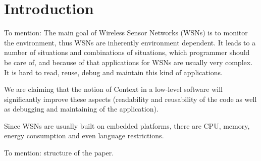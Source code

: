 \section{Introduction}
To mention: The main goal of Wireless Sensor Networks (WSNs) is to monitor the environment, thus WSNs are inherently environment dependent. It leads to a number of situations and combinations of situations, which programmer should be care of, and because of that applications for WSNs are usually very complex. It is hard to read, reuse, debug and maintain this kind of applications.

We are claiming that the notion of Context in a low-level software will significantly improve these aspects (readability and reusability of the code as well as debugging and maintaining of the application).

Since WSNs are usually built on embedded platforms, there are CPU, memory, energy consumption and even language restrictions.

To mention: structure of the paper.